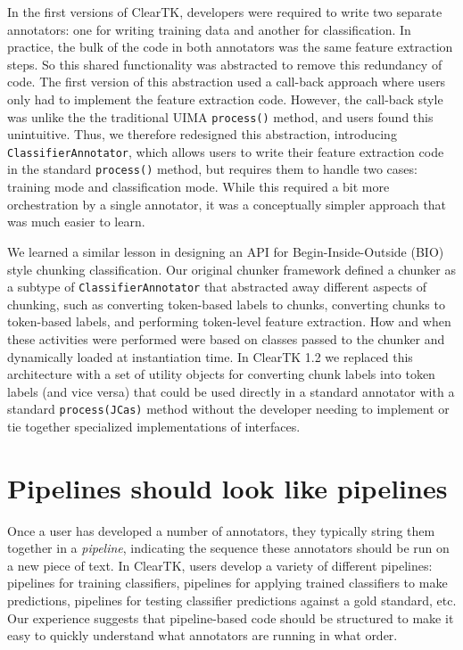 \documentclass[10pt, a4paper]{article}
\newcommand{\code}[1]{\texttt{\small #1}}
\begin{document}
In the first versions of ClearTK, developers were required to write two separate annotators: one for writing training data and another for classification.
In practice, the bulk of the code in both annotators was the same feature extraction steps.
So this shared functionality was abstracted to remove this redundancy of code.
The first version of this abstraction used a call-back approach where users only had to implement the feature extraction code.
However, the call-back style was unlike the the traditional UIMA \code{process()} method, and users found this unintuitive.
Thus, we therefore redesigned this abstraction, introducing \code{ClassifierAnnotator}, which allows users to write their feature extraction code in the standard \code{process()} method, but requires them to handle two cases: training mode and classification mode.
While this required a bit more orchestration by a single annotator, it was a conceptually simpler approach that was much easier to learn.  

We learned a similar lesson in designing an API for Begin-Inside-Outside (BIO) style chunking classification.
Our original chunker framework defined a chunker as a subtype of \code{ClassifierAnnotator} that abstracted away different aspects of chunking, such as converting token-based labels to chunks, converting chunks to token-based labels, and performing token-level feature extraction.
How and when these activities were performed were based on classes passed to the chunker and dynamically loaded at instantiation time.
In ClearTK 1.2 we replaced this architecture with a set of utility objects for converting chunk labels into token labels (and vice versa) that could be used directly in a standard annotator with a standard \code{process(JCas)} method without the developer needing to implement or tie together specialized implementations of interfaces.  


\section{Pipelines should look like pipelines}
Once a user has developed a number of annotators, they typically string them together in a \emph{pipeline}, indicating the sequence these annotators should be run on a new piece of text.
In ClearTK, users develop a variety of different pipelines: pipelines for training classifiers, pipelines for applying trained classifiers to make predictions, pipelines for testing classifier predictions against a gold standard, etc.
Our experience suggests that pipeline-based code should be structured to make it easy to quickly understand what annotators are running in what order.
\end{document}
